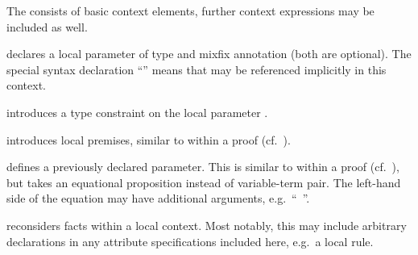 \begin{isabellebody}
\begin{isamarkuptext}
\begin{descr}
  The  consists of basic context elements, further context
  expressions may be included as well.

  \begin{descr}

  \item [\hyperlink{element.fixes}{\mbox{\isa{\isakeyword{fixes}}}}~\isa{{\isachardoublequote}x\ {\isacharcolon}{\isacharcolon}\ {\isasymtau}\ {\isacharparenleft}mx{\isacharparenright}{\isachardoublequote}}] declares a local
  parameter of type \isa{{\isasymtau}} and mixfix annotation  (both
  are optional).  The special syntax declaration ``\isa{{\isachardoublequote}{\isacharparenleft}{\isasymSTRUCTURE}{\isacharparenright}{\isachardoublequote}}'' means that  may be referenced
  implicitly in this context.

  \item [\hyperlink{element.constrains}{\mbox{\isa{\isakeyword{constrains}}}}~\isa{{\isachardoublequote}x\ {\isacharcolon}{\isacharcolon}\ {\isasymtau}{\isachardoublequote}}] introduces a type
  constraint \isa{{\isasymtau}} on the local parameter .

  \item [\hyperlink{element.assumes}{\mbox{\isa{\isakeyword{assumes}}}}~\isa{{\isachardoublequote}a{\isacharcolon}\ {\isasymphi}\isactrlsub {\isadigit{1}}\ {\isasymdots}\ {\isasymphi}\isactrlsub n{\isachardoublequote}}]
  introduces local premises, similar to \hyperlink{command.assume}{\mbox{}} within a
  proof (cf.\ ).

  \item [\hyperlink{element.defines}{\mbox{\isa{\isakeyword{defines}}}}~\isa{{\isachardoublequote}a{\isacharcolon}\ x\ {\isasymequiv}\ t{\isachardoublequote}}] defines a previously
  declared parameter.  This is similar to \hyperlink{command.def}{\mbox{}} within a
  proof (cf.\ ), but \hyperlink{element.defines}{\mbox{}}
  takes an equational proposition instead of variable-term pair.  The
  left-hand side of the equation may have additional arguments, e.g.\
  ``\hyperlink{element.defines}{\mbox{}}~''.

  \item [\hyperlink{element.notes}{\mbox{\isa{\isakeyword{notes}}}}~\isa{{\isachardoublequote}a\ {\isacharequal}\ b\isactrlsub {\isadigit{1}}\ {\isasymdots}\ b\isactrlsub n{\isachardoublequote}}]
  reconsiders facts within a local context.  Most notably, this may
  include arbitrary declarations in any attribute specifications
  included here, e.g.\ a local \hyperlink{attribute.simp}{\mbox{}} rule.


\end{descr}
\end{descr}
\end{isamarkuptext}
\end{isabellebody}
